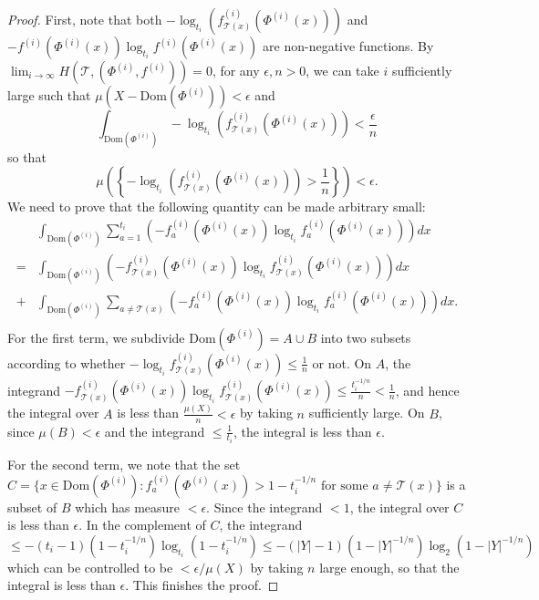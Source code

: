 \documentclass{article}
\theoremstyle{plain}
\theoremstyle{definition}
\theoremstyle{remark}
\newcommand{\cT}{\mathcal{T}}
\begin{document}
\begin{proof}
	First, note that both $-\log_{t_i}\left(f^{(i)}_{\cT(x)}(\Phi^{(i)}(x))\right)$ and $-f^{(i)}(\Phi^{(i)}(x)) \log_{t_i} f^{(i)}(\Phi^{(i)}(x))$ are non-negative functions. By $\lim_{i\to\infty} H(\cT,(\Phi^{(i)},f^{(i)})) = 0$, for any $\epsilon, n>0$, we can take $i$ sufficiently large such that $\mu(X-\mathrm{Dom}(\Phi^{(i)})) < \epsilon$ and 
	$$ \int_{\mathrm{Dom}(\Phi^{(i)})} -\log_{t_i} \left(f^{(i)}_{\cT(x)}(\Phi^{(i)}(x))\right) < \frac{\epsilon}{n}$$
	so that $$\mu\left(\left\{-\log_{t_i}\left(f^{(i)}_{\cT(x)}(\Phi^{(i)}(x))\right) > \frac{1}{n}\right\}\right) < \epsilon.$$
	We need to prove that the following quantity can be made arbitrary small:
	\begin{align*}
		& \int_{\mathrm{Dom}(\Phi^{(i)})} \sum_{a=1}^{t_i} \left(-f^{(i)}_a(\Phi^{(i)}(x)) \log_{t_i} f^{(i)}_a(\Phi^{(i)}(x)) \right) dx \\
		=& \int_{\mathrm{Dom}(\Phi^{(i)})} \left(-f^{(i)}_{\cT(x)}(\Phi^{(i)}(x)) \log_{t_i} f^{(i)}_{\cT(x)}(\Phi^{(i)}(x)) \right) dx\\
		+& \int_{\mathrm{Dom}(\Phi^{(i)})} \sum_{a\not=\cT(x)} \left(-f^{(i)}_a(\Phi^{(i)}(x)) \log_{t_i} f^{(i)}_a(\Phi^{(i)}(x)) \right) dx.\\
	\end{align*}
	For the first term, we subdivide $\mathrm{Dom}(\Phi^{(i)}) = A \cup B$ into two subsets according to whether $-\log_{t_i} f^{(i)}_{\cT(x)}(\Phi^{(i)}(x)) \leq \frac{1}{n}$ or not. On $A$, the integrand $-f^{(i)}_{\cT(x)}(\Phi^{(i)}(x)) \log_{t_i} f^{(i)}_{\cT(x)}(\Phi^{(i)}(x)) \leq \frac{t_i^{-1/n}}{n} < \frac{1}{n}$, and hence the integral over $A$ is less than $\frac{\mu(X)}{n} < \epsilon$ by taking $n$ sufficiently large.  On $B$, since $\mu(B) < \epsilon$ and the integrand $\leq \frac{1}{t_i}$, the integral is less than $\epsilon$.
	
	For the second term, we note that the set $C = \{x \in \mathrm{Dom}(\Phi^{(i)}):f^{(i)}_a(\Phi^{(i)}(x)) > 1 - t_i^{-1/n} \textrm{ for some } a\not=\cT(x)\}$ is a subset of $B$ which has measure $< \epsilon$. Since the integrand $< 1$, the integral over $C$ is less than $\epsilon$. In the complement of $C$, the integrand $\leq -(t_i-1)(1 - t_i^{-1/n}) \log_{t_i} (1 - t_i^{-1/n}) \leq -(|Y|-1)(1 - |Y|^{-1/n}) \log_{2} (1 - |Y|^{-1/n})$ which can be controlled to be $<\epsilon / \mu(X)$ by taking $n$ large enough, so that the integral is less than $\epsilon$. This finishes the proof.
\end{proof}
\end{document}
